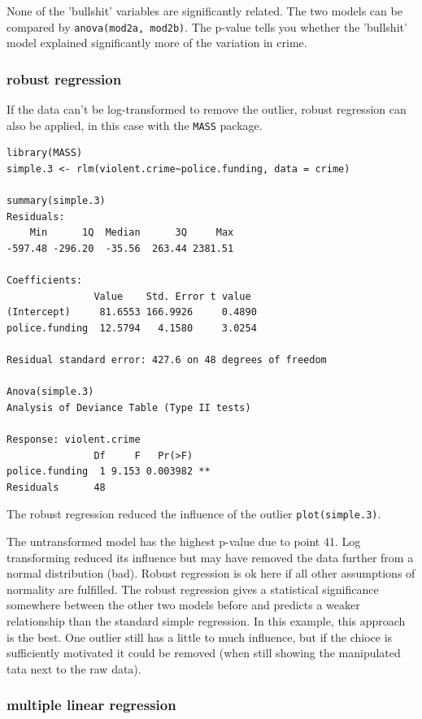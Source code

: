 \documentclass{article}
\begin{document}
None of the 'bullshit' variables are significantly related. The two models can be compared by \texttt{anova(mod2a, mod2b)}. The p-value tells you whether the 'bullshit' model explained significantly more of the variation in crime.

\subsubsection{robust regression}
If the data can't be log-transformed to remove the outlier, robust regression can also be applied, in this case with the \texttt{MASS} package.

\begin{lstlisting}
library(MASS)
simple.3 <- rlm(violent.crime~police.funding, data = crime)

summary(simple.3)
Residuals:
    Min      1Q  Median      3Q     Max 
-597.48 -296.20  -35.56  263.44 2381.51 

Coefficients:
               Value    Std. Error t value 
(Intercept)     81.6553 166.9926     0.4890
police.funding  12.5794   4.1580     3.0254

Residual standard error: 427.6 on 48 degrees of freedom

Anova(simple.3)
Analysis of Deviance Table (Type II tests)

Response: violent.crime
               Df     F   Pr(>F)   
police.funding  1 9.153 0.003982 **
Residuals      48  
\end{lstlisting}

The robust regression reduced the influence of the outlier \texttt{plot(simple.3)}.\par 
The untransformed model has the highest p-value due to point 41. Log transforming reduced its influence but may have removed the data further from a normal distribution (bad). Robust regression is ok here if all other assumptions of normality are fulfilled. The robust regression gives a statistical significance somewhere between the other two models before and predicts a weaker relationship than the standard simple regression. In this example, this approach is the best. One outlier still has a little to much influence, but if the chioce is sufficiently motivated it could be removed (when still showing the manipulated tata next to the raw data).

\subsubsection{multiple linear regression}
\end{document}
